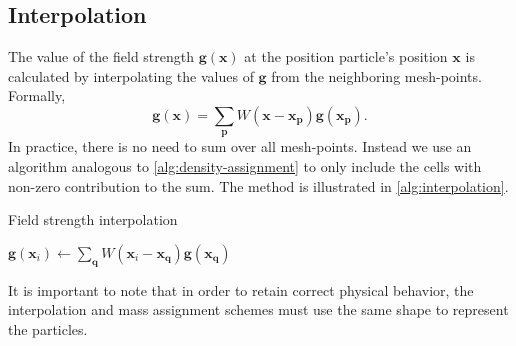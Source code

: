 \subsection{Interpolation}
The value of the field strength $\mathbf{g}(\mathbf{x})$ at the position particle's position $\mathbf{x}$ is calculated by interpolating the values of $\mathbf{g}$ from the neighboring mesh-points.
Formally,
\begin{equation*}
    \mathbf{g}(\mathbf{x}) = \sum_\mathbf{p} W(\mathbf{x} - \mathbf{x}_\mathbf{p}) \mathbf{g}(\mathbf{x}_\mathbf{p}).
\end{equation*}
In practice, there is no need to sum over all mesh-points.
Instead we use an algorithm analogous to \autoref{alg:density-assignment} to only include the cells with non-zero contribution to the sum.
The method is illustrated in \autoref{alg:interpolation}.
\begin{algorithm}
    \caption{Field strength interpolation}\label{alg:interpolation}
    \begin{algorithmic}
        \State $\mathbf{g}(\mathbf{x}_i) \gets  \sum_\mathbf{q} W(\mathbf{x}_i - \mathbf{x}_\mathbf{q}) \mathbf{g}(\mathbf{x}_\mathbf{q})$
        \EndFor
        \EndFor
    \end{algorithmic}
\end{algorithm}
It is important to note that in order to retain correct physical behavior, the interpolation and mass assignment schemes must use the same shape to represent the particles.
